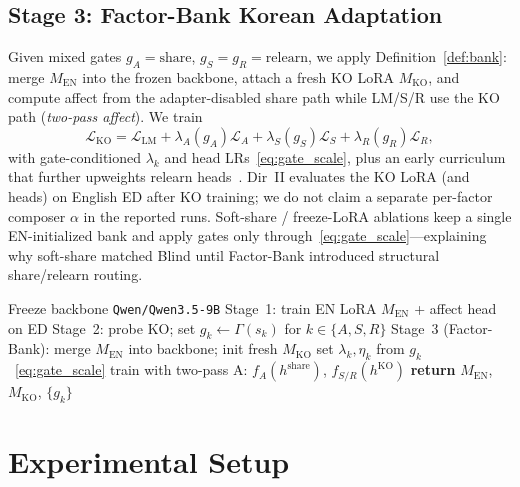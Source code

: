 \documentclass[journal]{IEEEtran}
\begin{document}
\subsection{Stage 3: Factor-Bank Korean Adaptation}
Given mixed gates $g_A{=}\mathrm{share}$, $g_S{=}g_R{=}\mathrm{relearn}$, we apply Definition~\ref{def:bank}:
merge $M_{\mathrm{EN}}$ into the frozen backbone, attach a fresh KO LoRA $M_{\mathrm{KO}}$, and compute affect from the adapter-disabled share path while LM/S/R use the KO path (\emph{two-pass affect}).
We train
\begin{equation}
\label{eq:ko_loss}
\mathcal{L}_{\mathrm{KO}}=\mathcal{L}_{\mathrm{LM}}+\lambda_A(g_A)\mathcal{L}_A+\lambda_S(g_S)\mathcal{L}_S+\lambda_R(g_R)\mathcal{L}_R,
\end{equation}
with gate-conditioned $\lambda_k$ and head LRs~\eqref{eq:gate_scale}, plus an early curriculum that further upweights relearn heads~\cite{liu2021esc,sharma2020empathy}.
Dir~II evaluates the KO LoRA (and heads) on English ED after KO training; we do not claim a separate per-factor composer $\alpha$ in the reported runs.
Soft-share / freeze-LoRA ablations keep a single EN-initialized bank and apply gates only through~\eqref{eq:gate_scale}---explaining why soft-share matched Blind until Factor-Bank introduced structural share/relearn routing.

\begin{algorithm}[t]
\caption{SELENE Factor-Bank (implemented)}
\label{alg:select}
\begin{algorithmic}
\STATE Freeze backbone \texttt{Qwen/Qwen3.5-9B}
\STATE Stage~1: train EN LoRA $M_{\mathrm{EN}}$ + affect head on ED
\STATE Stage~2: probe KO; set $g_k\!\leftarrow\!\Gamma(s_k)$ for $k\in\{A,S,R\}$
\STATE Stage~3 (Factor-Bank):
\STATE \hspace{0.25cm} merge $M_{\mathrm{EN}}$ into backbone; init fresh $M_{\mathrm{KO}}$
\STATE \hspace{0.25cm} set $\lambda_k,\eta_k$ from $g_k$~\eqref{eq:gate_scale}
\STATE \hspace{0.25cm} train with two-pass A: $f_A(h^{\mathrm{share}})$, $f_{S/R}(h^{\mathrm{KO}})$
\STATE \textbf{return} $M_{\mathrm{EN}}$, $M_{\mathrm{KO}}$, $\{g_k\}$
\end{algorithmic}
\end{algorithm}

\section{Experimental Setup}
\end{document}
